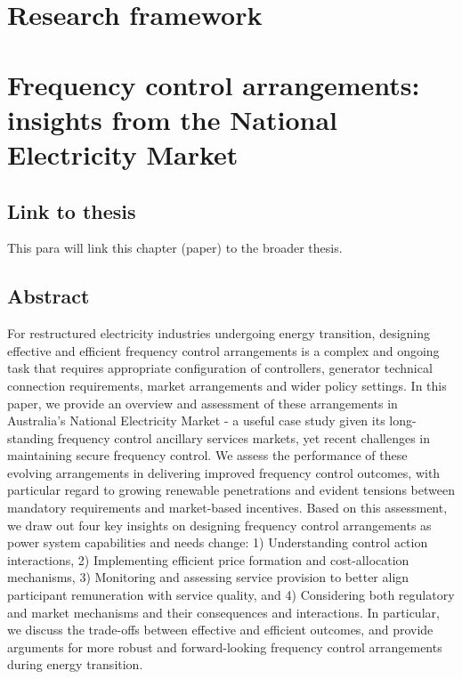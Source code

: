 \documentclass[12pt,a4paper,]{report}
\begin{document}
\hypertarget{sec:research_framework}{%
\chapter{Research framework}\label{sec:research_framework}}

\hypertarget{sec:fcs}{%
\chapter{Frequency control arrangements: insights from the National
Electricity Market}\label{sec:fcs}}

\hypertarget{link-to-thesis}{%
\section{Link to thesis}\label{link-to-thesis}}

This para will link this chapter (paper) to the broader thesis.

\hypertarget{abstract-1}{%
\section{Abstract}\label{abstract-1}}

For restructured electricity industries undergoing energy transition,
designing effective and efficient frequency control arrangements is a
complex and ongoing task that requires appropriate configuration of
controllers, generator technical connection requirements, market
arrangements and wider policy settings. In this paper, we provide an
overview and assessment of these arrangements in Australia's National
Electricity Market - a useful case study given its long-standing
frequency control ancillary services markets, yet recent challenges in
maintaining secure frequency control. We assess the performance of these
evolving arrangements in delivering improved frequency control outcomes,
with particular regard to growing renewable penetrations and evident
tensions between mandatory requirements and market-based incentives.
Based on this assessment, we draw out four key insights on designing
frequency control arrangements as power system capabilities and needs
change: 1) Understanding control action interactions, 2) Implementing
efficient price formation and cost-allocation mechanisms, 3) Monitoring
and assessing service provision to better align participant remuneration
with service quality, and 4) Considering both regulatory and market
mechanisms and their consequences and interactions. In particular, we
discuss the trade-offs between effective and efficient outcomes, and
provide arguments for more robust and forward-looking frequency control
arrangements during energy transition.
\end{document}
